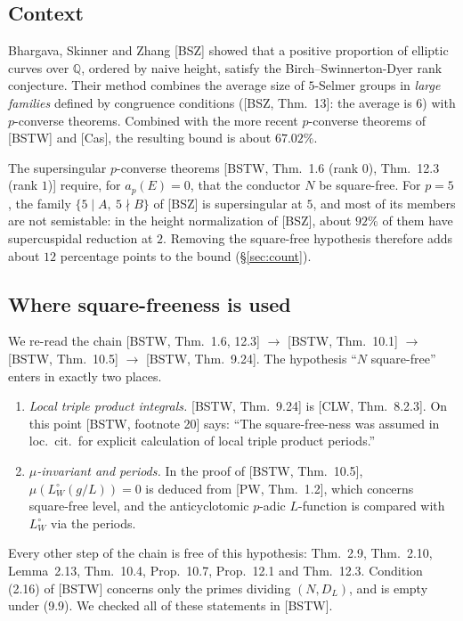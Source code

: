 \documentclass[11pt]{amsart}
\theoremstyle{definition}
\theoremstyle{remark}
\newcommand{\Q}{\mathbb{Q}}
\begin{document}
\subsection{Context}
Bhargava, Skinner and Zhang [BSZ] showed that a positive proportion of elliptic curves over $\Q$, ordered by naive height, satisfy the Birch--Swinnerton-Dyer rank conjecture. Their method combines the average size of $5$-Selmer groups in \emph{large families} defined by congruence conditions ([BSZ, Thm.~13]: the average is $6$) with $p$-converse theorems. Combined with the more recent $p$-converse theorems of [BSTW] and [Cas], the resulting bound is about $67.02\%$.

The supersingular $p$-converse theorems [BSTW, Thm.~1.6 (rank $0$), Thm.~12.3 (rank $1$)] require, for $a_p(E)=0$, that the conductor $N$ be square-free. For $p=5$, the family $\{5\mid A,\ 5\nmid B\}$ of [BSZ] is supersingular at $5$, and most of its members are not semistable: in the height normalization of [BSZ], about $92\%$ of them have supercuspidal reduction at $2$. Removing the square-free hypothesis therefore adds about $12$ percentage points to the bound (\S\ref{sec:count}).

\subsection{Where square-freeness is used}
We re-read the chain [BSTW, Thm.~1.6, 12.3] $\to$ [BSTW, Thm.~10.1] $\to$ [BSTW, Thm.~10.5] $\to$ [BSTW, Thm.~9.24]. The hypothesis ``$N$ square-free'' enters in exactly two places.
\begin{enumerate}[label=(\Alph*)]
\item \emph{Local triple product integrals.} [BSTW, Thm.~9.24] is [CLW, Thm.~8.2.3]. On this point [BSTW, footnote 20] says: ``The square-free-ness was assumed in loc.\ cit.\ for explicit calculation of local triple product periods.''
\item \emph{$\mu$-invariant and periods.} In the proof of [BSTW, Thm.~10.5], $\mu(L^\circ_W(g/L))=0$ is deduced from [PW, Thm.~1.2], which concerns square-free level, and the anticyclotomic $p$-adic $L$-function is compared with $L^\circ_W$ via the periods.
\end{enumerate}
Every other step of the chain is free of this hypothesis: Thm.~2.9, Thm.~2.10, Lemma~2.13, Thm.~10.4, Prop.~10.7, Prop.~12.1 and Thm.~12.3. Condition (2.16) of [BSTW] concerns only the primes dividing $(N,D_L)$, and is empty under (9.9). We checked all of these statements in [BSTW].
\end{document}

